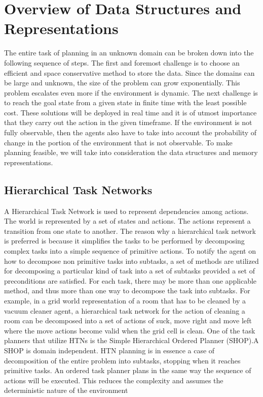 \documentclass[tog]{acmsiggraph}
\begin{document}
\section{Overview of Data Structures and Representations}
The entire task of planning in an unknown domain can be broken down
into the following sequence of steps. The first and foremost challenge
is to choose an efficient and space conservative method to store the
data. Since the domains can be large and unknown, the size of the
problem can grow exponentially. This problem escalates even more if
the environment is dynamic. The next challenge is to reach the goal
state from a given state in finite time with the least possible cost.
These solutions will be deployed in real time and it is of utmost
importance that they carry out the action in the given timeframe. If
the environment is not fully observable, then the agents also have to
take into account the probability of change in the portion of the
environment that is not observable. To make planning feasible, we will
take into consideration the data structures and memory
representations.

\subsection{Hierarchical Task Networks}

A Hierarchical Task Network is used to represent dependencies among
actions. The world is represented by a set of states and actions. The
actions represent a transition from one state to another. The reason
why a hierarchical task network is preferred is because it simplifies
the tasks to be performed by decomposing complex tasks into a simple
sequence of primitive actions. To notify the agent on how to decompose
non primitive tasks into subtasks, a set of methods are utilized for
decomposing a particular kind of task into a set of subtasks provided
a set of preconditions are satisfied. For each task, there may be more
than one applicable method, and thus more than one way to decompose
the task into subtasks. For example, in a grid
world representation of a room that has to be cleaned by a vacuum
cleaner agent, a hierarchical task network for the action of cleaning
a room can be decomposed into a set of actions of suck, move right and
move left where the move actions become valid when the grid cell is
clean. One of the task planners that utilize HTNs is the Simple
Hierarchical Ordered Planner (SHOP).A SHOP is domain independent. HTN
planning is in essence a case of decomposition of the entire problem
into subtasks, stopping when it reaches primitive tasks. An ordered
task planner plans in the same way the sequence of actions will be
executed. This reduces the complexity and assumes the deterministic
nature of the environment
\end{document}
